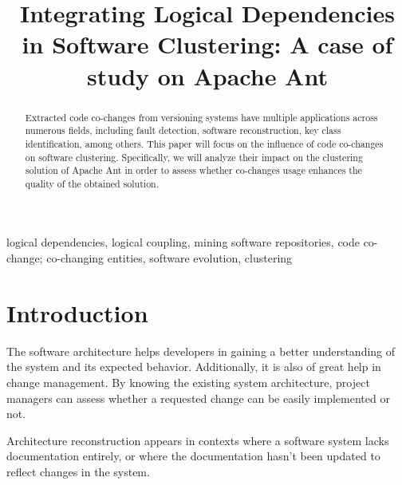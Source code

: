 \documentclass[conference]{IEEEtran}
\begin{document}
\title{Integrating Logical Dependencies in Software Clustering: A case of study on Apache Ant}

\author{
\and
{}
}

\maketitle

\begin{abstract}
Extracted code co-changes from versioning systems have multiple applications across numerous fields, including fault detection, software reconstruction, key class identification, among others. This paper will focus on the influence of code co-changes on software clustering. Specifically, we will analyze their impact on the clustering solution of Apache Ant in order to assess whether co-changes usage enhances the quality of the obtained solution.
\end{abstract}

\begin{IEEEkeywords}
logical dependencies, logical coupling, mining software repositories, code co-change; co-changing entities, software evolution, clustering
\end{IEEEkeywords}

\section{Introduction}

The software architecture helps developers in gaining a better understanding of the system and its expected behavior. Additionally, it is also of great help in change management. By knowing the existing system architecture, project managers can assess whether a requested change can be easily implemented or not.

Architecture reconstruction appears in contexts where a software system lacks documentation entirely, or where the documentation hasn't been updated to reflect changes in the system. 
\end{document}
